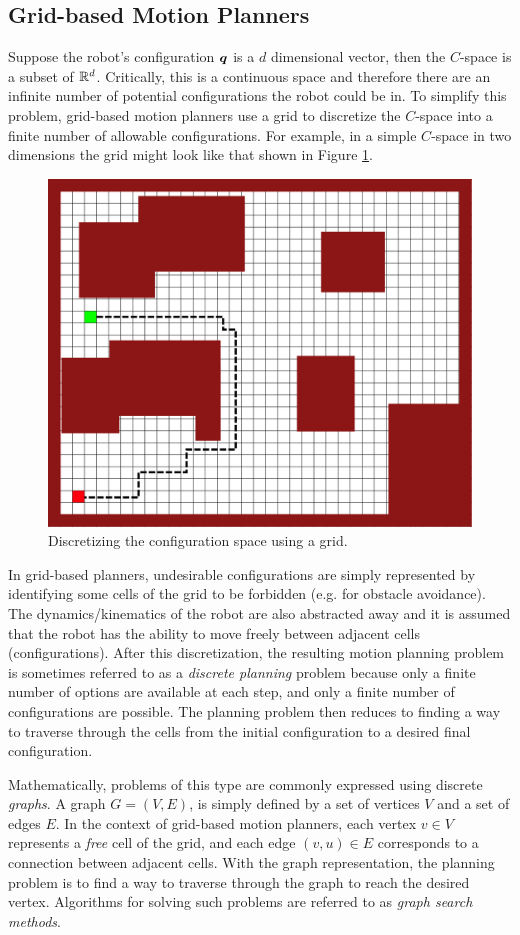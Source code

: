 \subsection{Grid-based Motion Planners}
Suppose the robot's configuration $\bm{q}$ is a $d$ dimensional vector, then the $C$-space is a subset of $\mathbb{R}^d$. Critically, this is a continuous space and therefore there are an infinite number of potential configurations the robot could be in. To simplify this problem, grid-based motion planners use a grid to discretize the $C$-space into a finite number of allowable configurations. For example, in a simple $C$-space in two dimensions the grid might look like that shown in Figure \ref{fig:grid}.
\begin{figure}[ht] 
    \centering 
    \includegraphics[width=0.65\linewidth]{tex/figs/ch05_figs/2d_ws_grid.png}
    \caption{Discretizing the configuration space using a grid.}
    \label{fig:grid} 
\end{figure} 
In grid-based planners, undesirable configurations are simply represented by identifying some cells of the grid to be forbidden (e.g. for obstacle avoidance). The dynamics/kinematics of the robot are also abstracted away and it is assumed that the robot has the ability to move freely between adjacent cells (configurations).
After this discretization, the resulting motion planning problem is sometimes referred to as a \textit{discrete planning} problem because only a finite number of options are available at each step, and only a finite number of configurations are possible. The planning problem then reduces to finding a way to traverse through the cells from the initial configuration to a desired final configuration.

Mathematically, problems of this type are commonly expressed using discrete \textit{graphs}. A graph $G = (V,E)$, is simply defined by a set of vertices $V$ and a set of edges $E$. In the context of grid-based motion planners, each vertex $v \in V$ represents a \textit{free} cell of the grid, and each edge $(v,u) \in E$ corresponds to a connection between adjacent cells. With the graph representation, the planning problem is to find a way to traverse through the graph to reach the desired vertex. Algorithms for solving such problems are referred to as \textit{graph search methods}.


